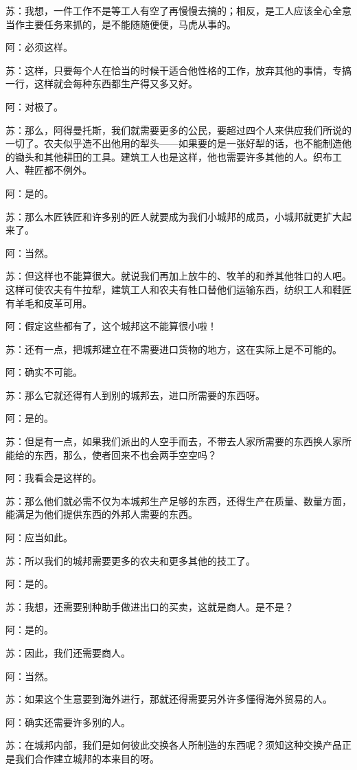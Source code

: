 \documentclass[12pt,oneside]{book}
\begin{document}
苏：我想，一件工作不是等工人有空了再慢慢去搞的；相反，是工人应该全心全意当作主要任务来抓的，是不能随随便便，马虎从事的。

阿：必须这样。

苏：这样，只要每个人在恰当的时候干适合他性格的工作，放弃其他的事情，专搞一行，这样就会每种东西都生产得又多又好。

阿：对极了。

苏：那么，阿得曼托斯，我们就需要更多的公民，要超过四个人来供应我们所说的一切了。农夫似乎造不出他用的犁头——如果要的是一张好犁的话，也不能制造他的锄头和其他耕田的工具。建筑工人也是这样，他也需要许多其他的人。织布工人、鞋匠都不例外。

阿：是的。

苏：那么木匠铁匠和许多别的匠人就要成为我们小城邦的成员，小城邦就更扩大起来了。

阿：当然。

苏：但这样也不能算很大。就说我们再加上放牛的、牧羊的和养其他牲口的人吧。这样可使农夫有牛拉犁，建筑工人和农夫有牲口替他们运输东西，纺织工人和鞋匠有羊毛和皮革可用。

阿：假定这些都有了，这个城邦这不能算很小啦！

苏：还有一点，把城邦建立在不需要进口货物的地方，这在实际上是不可能的。

阿：确实不可能。

苏：那么它就还得有人到别的城邦去，进口所需要的东西呀。

阿：是的。

苏：但是有一点，如果我们派出的人空手而去，不带去人家所需要的东西换人家所能给的东西，那么，使者回来不也会两手空空吗？

阿：我看会是这样的。

苏：那么他们就必需不仅为本城邦生产足够的东西，还得生产在质量、数量方面，能满足为他们提供东西的外邦人需要的东西。

阿：应当如此。

苏：所以我们的城邦需要更多的农夫和更多其他的技工了。

阿：是的。

苏：我想，还需要别种助手做进出口的买卖，这就是商人。是不是？

阿：是的。

苏：因此，我们还需要商人。

阿：当然。

苏：如果这个生意要到海外进行，那就还得需要另外许多懂得海外贸易的人。

阿：确实还需要许多别的人。

苏：在城邦内部，我们是如何彼此交换各人所制造的东西呢？须知这种交换产品正是我们合作建立城邦的本来目的呀。
\end{document}

